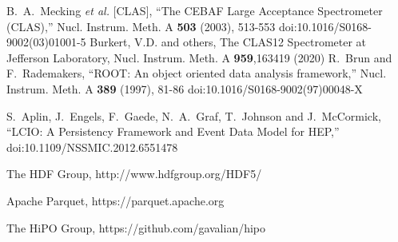 \documentclass[preprint,12pt]{elsarticle}
\begin{document}
 
\begin{thebibliography}{}
B.~A.~Mecking \textit{et al.} [CLAS],
``The CEBAF Large Acceptance Spectrometer (CLAS),''
Nucl. Instrum. Meth. A \textbf{503} (2003), 513-553
doi:10.1016/S0168-9002(03)01001-5
Burkert, V.D. and others, The CLAS12 Spectrometer at Jefferson Laboratory, Nucl. Instrum. Meth. A \textbf{959},163419 (2020)
R.~Brun and F.~Rademakers,
``ROOT: An object oriented data analysis framework,''
Nucl. Instrum. Meth. A \textbf{389} (1997), 81-86
doi:10.1016/S0168-9002(97)00048-X

S.~Aplin, J.~Engels, F.~Gaede, N.~A.~Graf, T.~Johnson and J.~McCormick,
``LCIO: A Persistency Framework and Event Data Model for HEP,''
doi:10.1109/NSSMIC.2012.6551478

The HDF Group,  http://www.hdfgroup.org/HDF5/

Apache Parquet, https://parquet.apache.org

The HiPO Group, 
https://github.com/gavalian/hipo
\end{thebibliography}
%
%
\end{document}
